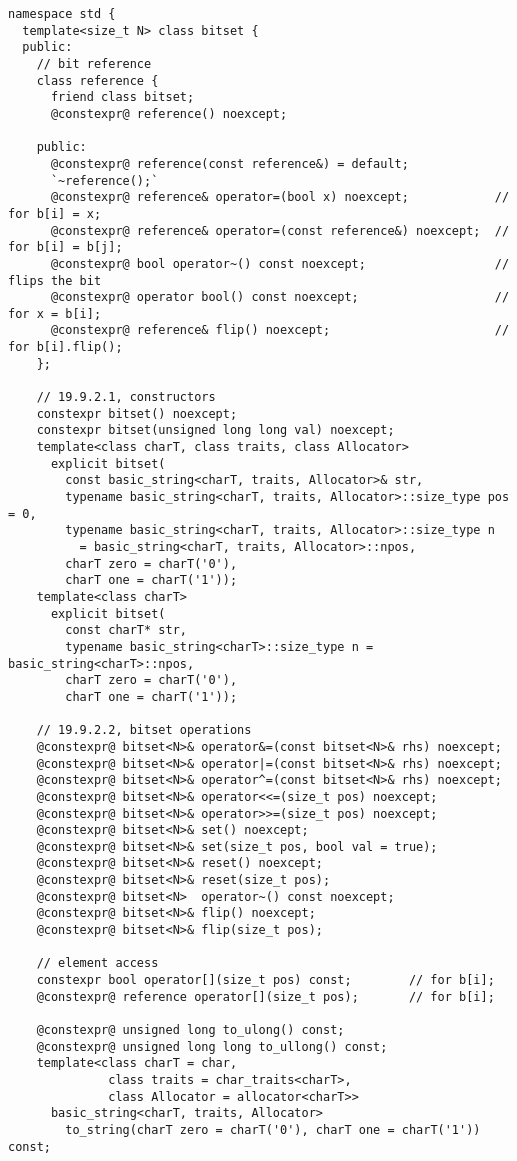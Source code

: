 \documentclass[ebook,11pt,article,a4paper]{memoir}
\begin{document}
\begin{lstlisting}[style=cppdiff]
namespace std {
  template<size_t N> class bitset {
  public:
    // bit reference
    class reference {
      friend class bitset;
      @constexpr@ reference() noexcept;

    public:
      @constexpr@ reference(const reference&) = default;
      `~reference();`
      @constexpr@ reference& operator=(bool x) noexcept;            // for b[i] = x;
      @constexpr@ reference& operator=(const reference&) noexcept;  // for b[i] = b[j];
      @constexpr@ bool operator~() const noexcept;                  // flips the bit
      @constexpr@ operator bool() const noexcept;                   // for x = b[i];
      @constexpr@ reference& flip() noexcept;                       // for b[i].flip();
    };

    // 19.9.2.1, constructors
    constexpr bitset() noexcept;
    constexpr bitset(unsigned long long val) noexcept;
    template<class charT, class traits, class Allocator>
      explicit bitset(
        const basic_string<charT, traits, Allocator>& str,
        typename basic_string<charT, traits, Allocator>::size_type pos = 0,
        typename basic_string<charT, traits, Allocator>::size_type n
          = basic_string<charT, traits, Allocator>::npos,
        charT zero = charT('0'),
        charT one = charT('1'));
    template<class charT>
      explicit bitset(
        const charT* str,
        typename basic_string<charT>::size_type n = basic_string<charT>::npos,
        charT zero = charT('0'),
        charT one = charT('1'));

    // 19.9.2.2, bitset operations
    @constexpr@ bitset<N>& operator&=(const bitset<N>& rhs) noexcept;
    @constexpr@ bitset<N>& operator|=(const bitset<N>& rhs) noexcept;
    @constexpr@ bitset<N>& operator^=(const bitset<N>& rhs) noexcept;
    @constexpr@ bitset<N>& operator<<=(size_t pos) noexcept;
    @constexpr@ bitset<N>& operator>>=(size_t pos) noexcept;
    @constexpr@ bitset<N>& set() noexcept;
    @constexpr@ bitset<N>& set(size_t pos, bool val = true);
    @constexpr@ bitset<N>& reset() noexcept;
    @constexpr@ bitset<N>& reset(size_t pos);
    @constexpr@ bitset<N>  operator~() const noexcept;
    @constexpr@ bitset<N>& flip() noexcept;
    @constexpr@ bitset<N>& flip(size_t pos);

    // element access
    constexpr bool operator[](size_t pos) const;        // for b[i];
    @constexpr@ reference operator[](size_t pos);       // for b[i];

    @constexpr@ unsigned long to_ulong() const;
    @constexpr@ unsigned long long to_ullong() const;
    template<class charT = char,
              class traits = char_traits<charT>,
              class Allocator = allocator<charT>>
      basic_string<charT, traits, Allocator>
        to_string(charT zero = charT('0'), charT one = charT('1')) const;


\end{lstlisting}
\end{document}
